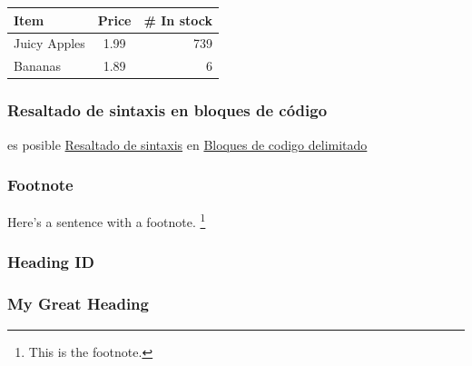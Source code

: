 \begin{longtable}[]{@{}lcr@{}}
\toprule()
Item & Price & \# In stock \\
\midrule()
\endhead
Juicy Apples & 1.99 & 739 \\
Bananas & 1.89 & 6 \\
\bottomrule()
\end{longtable}

\hypertarget{resaltado-de-sintaxis-en-bloques-de-cuxf3digo}{%
\subsubsection{Resaltado de sintaxis en bloques de
código}\label{resaltado-de-sintaxis-en-bloques-de-cuxf3digo}}

es posible
\href{https://pandoc.org/MANUAL.html\#syntax-highlighting}{Resaltado de
sintaxis} en
\href{https://pandoc.org/MANUAL.html\#fenced-code-blocks}{Bloques de
codigo delimitado}

\begin{Shaded}
\begin{Highlighting}[]
\end{Highlighting}
\end{Shaded}

\begin{Shaded}
\begin{Highlighting}[]
\FunctionTok{\{}
  \FunctionTok{:} \FunctionTok{,}
  \FunctionTok{:} \FunctionTok{,}
  \FunctionTok{:} 
\FunctionTok{\}}
\end{Highlighting}
\end{Shaded}

\hypertarget{footnote}{%
\subsubsection{Footnote}\label{footnote}}

Here's a sentence with a footnote. \footnote{This is the footnote.}

\hypertarget{heading-id}{%
\subsubsection{Heading ID}\label{heading-id}}

\hypertarget{custom-id}{%
\subsubsection{My Great Heading}\label{custom-id}}

